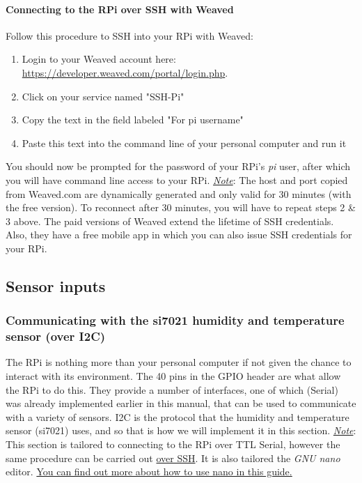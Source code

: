 \documentclass{article}
\newcommand{\note}[1]{\underline{\textit{Note}}: #1}
\begin{document}
    \paragraph{Connecting to the RPi over SSH with Weaved}
    Follow this procedure to SSH into your RPi with Weaved:
    \begin{enumerate}
      \item Login to your Weaved account here: \href{https://developer.weaved.com/portal/login.php}{https://developer.weaved.com/portal/login.php}.
      \item Click on your service named "SSH-Pi"
      \item Copy the text in the field labeled "For pi username"
      \item Paste this text into the command line of your personal computer and run it
    \end{enumerate}
    You should now be prompted for the password of your RPi's \textit{pi} user, after which you will have command line access to your RPi.
    \newline\newline
    \note{The host and port copied from Weaved.com are dynamically generated and only valid for 30 minutes (with the free version). To reconnect after 30 minutes, you will have to repeat steps 2 \& 3 above. The paid versions of Weaved extend the lifetime of SSH credentials. Also, they have a free mobile app in which you can also issue SSH credentials for your RPi.}

\subsection{Sensor inputs}
    \subsubsection{Communicating with the si7021 humidity and temperature sensor (over I2C)}
  The RPi is nothing more than your personal computer if not given the chance to interact with its environment. The 40 pins in the GPIO header are what allow the RPi to do this. They provide a number of interfaces, one of which (Serial) was already implemented earlier in this manual, that can be used to communicate with a variety of sensors. I2C is the protocol that the humidity and temperature sensor (si7021) uses, and so that is how we will implement it in this section.
  \newline\newline\underline{\textit{Note}}: This section is tailored to connecting to the RPi over TTL Serial, however the same procedure can be carried out \hyperref[sec:connect-ssh]{over SSH}. It is also tailored the \textit{GNU nano} editor. \href{http://www.howtogeek.com/howto/42980/the-beginners-guide-to-nano-the-linux-command-line-text-editor/}{You can find out more about how to use nano in this guide.}
\end{document}
